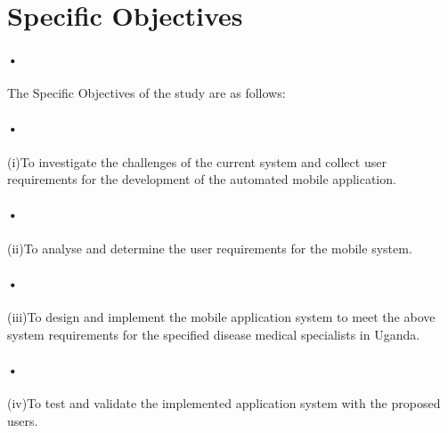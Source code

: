 \documentclass[12pt]{article}
\begin{document}
\section{Specific Objectives}
\paragraph{•}The Specific Objectives of the study are as follows:

\paragraph{•} (i)To investigate the challenges of the current system and collect user requirements for the development of the automated mobile application.
\paragraph{•}(ii)To analyse and determine the user requirements for the mobile system.
\paragraph{•}(iii)To design and implement the mobile application system to meet the above system requirements for the specified disease medical specialists in Uganda.  
\paragraph{•}(iv)To test and validate the implemented application system with the proposed users.
\end{document}
